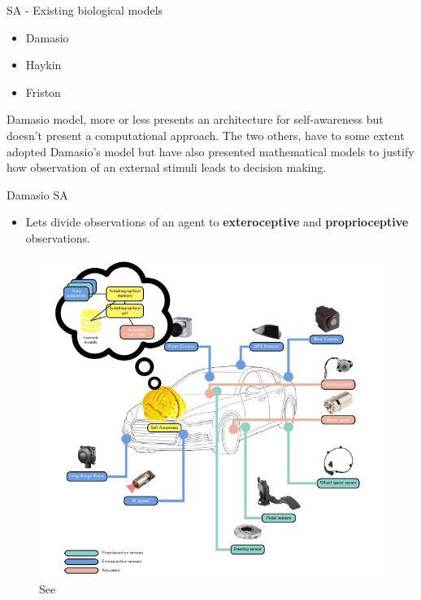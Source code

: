 \documentclass[handout]{beamer}
\begin{document}
\begin{frame}{SA - Existing biological models}
	\begin{itemize}
		\item Damasio \cite{damasio-1999-the-feeling-of-what-happens-body-and-emotion-in-the-making-of-consciousness}
		\item Haykin \cite{haykin-2012-cognitive-dynamic-systems-perception-action-cycle-radar-and-radio}
		\item Friston \cite{friston-2010-the-free-energy-principle-a-unified-brain-theory}
	\end{itemize}
	Damasio model, more or less presents an architecture for self-awareness but doesn't present a computational approach. The two others, have to some extent adopted Damasio's model but have also presented mathematical models to justify  how observation of an external stimuli leads to decision making. 
\end{frame}

\begin{frame}{Damasio SA}
	\begin{itemize}
		\item Lets divide observations of an agent to \textbf{exteroceptive}
		 and \textbf{proprioceptive} observations.
	\end{itemize}
	\begin{figure}
		\includegraphics[scale=0.3]{regazzoni-2020-multi-sensorial-generative-and-descriptive-self-awareness-models-for-autonomous-systems-fig-1.png}
		\caption{See \cite{regazzoni-2020-multi-sensorial-generative-and-descriptive-self-awareness-models-for-autonomous-systems}}
	\end{figure}
\end{frame}
\end{document}
